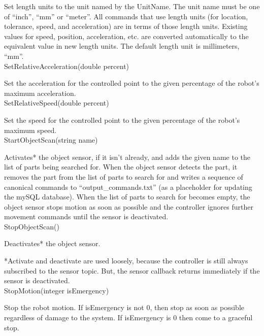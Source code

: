 Set length units to the unit named by the UnitName.
The unit name must be one of ``inch'', ``mm'' or ``meter''. All commands that
use length units (for location, tolerance, speed, and acceleration) are
in terms of those length units. Existing values for speed, position,
acceleration, etc. are converted automatically to the equivalent value
in new length units. The default length unit is millimeters, ``mm''.\\

\sf SetRelativeAcceleration(double percent)\rm

Set the acceleration for the controlled point to the given percentage of
the robot's maximum acceleration.\\

\sf SetRelativeSpeed(double percent)\rm


Set the speed for the controlled point to the given percentage of the
robot's maximum speed.\\

\sf StartObjectScan(string name)\rm

Activates* the object sensor, if it isn't already, and adds the given 
name to the list of parts being searched for. When the object sensor
detects the part, it removes the part from the list of parts to search
for and writes a sequence of canonical commands to ``output\_commands.txt'' 
(as a placeholder for updating the mySQL database). When the list of parts
to search for becomes empty, the object sensor stops motion as soon as 
possible and the controller ignores further movement commands until the
sensor is deactivated.\\

\sf StopObjectScan()\rm

Deactivates* the object sensor.

*Activate and deactivate are used loosely, because the controller is
still always subscribed to the sensor topic. But, the sensor callback 
returns immediately if the sensor is deactivated.\\

\sf StopMotion(integer isEmergency)\rm

Stop the robot motion. If \sf isEmergency \rm is not 0, then stop as soon
as possible regardless of damage to the system. If \sf isEmergency \rm is 0
then come to a graceful stop.\\

